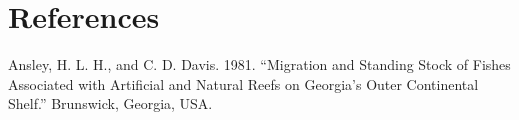\documentclass[
  letterpaper,
  oneside,
  open=any]{scrbook}
\newlength{\cslhangindent}
\newlength{\cslentryspacingunit} %
\newenvironment{CSLReferences}[2] %
 {%
  \setlength{\parindent}{0pt}
  \ifodd #1
  \let\oldpar\par
  \def\par{\hangindent=\cslhangindent\oldpar}
  \fi
  \setlength{\parskip}{#2\cslentryspacingunit}
 }%
 {}
\begin{document}

\hypertarget{references-1}{%
\chapter*{References}\label{references-1}}

\hypertarget{refs}{}
\begin{CSLReferences}{1}{0}
\leavevmode{}%
Ansley, H. L. H., and C. D. Davis. 1981. {``Migration and Standing Stock
of Fishes Associated with Artificial and Natural Reefs on Georgia{'}s
Outer Continental Shelf.''} Brunswick, Georgia, USA.

\end{CSLReferences}


\backmatter
\end{document}
